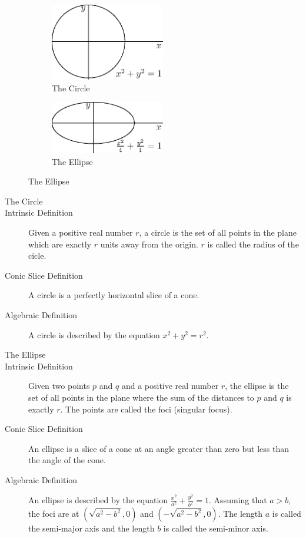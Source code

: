 \documentclass[fleqn]{report}
\begin{document}
\begin{figure}[t]
\centering
\begin{subfigure}{.5\textwidth}
 \centering
 \includegraphics[width=5cm]{figure03.eps}
 \caption{The Circle}
\end{subfigure}%
\begin{subfigure}{.5\textwidth}
 \centering
 \includegraphics[width=5cm]{figure06.eps}
 \caption{The Ellipse}
\end{subfigure}
\label{Conics 1}
\end{figure}

\begin{description}
\item[The Circle]
\item[Intrinsic Definition] Given a positive real number $r$,
a circle is the set of all points in the plane which are
exactly $r$ units away from the origin. $r$ is called the
radius of the cicle.
\item[Conic Slice Definition] A circle is a perfectly
horizontal slice of a cone.
\item[Algebraic Definition] A circle is described by the
equation $x^2 + y^2 = r^2$.
\end{description}

\begin{description}
\item[The Ellipse]
\item[Intrinsic Definition] Given two points $p$ and $q$ and a
positive real number $r$, the ellipse is the set of all points
in the plane where the sum of the distances to $p$ and $q$ is
exactly $r$. The points are called the foci (singular focus). 
\item[Conic Slice Definition] An ellipse is a slice of a cone
at an angle greater than zero but less than the angle of the
cone.
\item[Algebraic Definition] An ellipse is described by the
equation $\frac{x^2}{a^2} + \frac{y^2}{b^2} = 1$. Assuming
that $a>b$, the foci are at $(\sqrt{a^2-b^2},0)$ and
$(-\sqrt{a^2-b^2},0)$. The length $a$ is called the semi-major
axis and the length $b$ is called the semi-minor axis.
\end{description}
\end{document}
